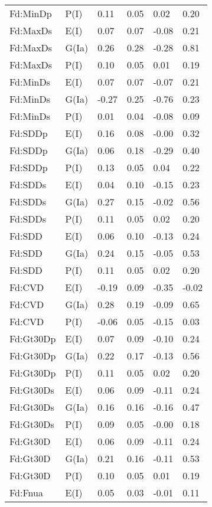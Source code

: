 \begin{center}
\begin{longtable}{|p{1.1in}|p{0.7in}|p{0.7in}|p{0.6in}|p{0.6in}|p{0.6in}|}
  Fd:MinDp & P(I) & 0.11 & 0.05 & 0.02 & 0.20 \\ 
  Fd:MaxDs & E(I) & 0.07 & 0.07 & -0.08 & 0.21 \\ 
  Fd:MaxDs & G(Ia) & 0.26 & 0.28 & -0.28 & 0.81 \\ 
  Fd:MaxDs & P(I) & 0.10 & 0.05 & 0.01 & 0.19 \\ 
  Fd:MinDs & E(I) & 0.07 & 0.07 & -0.07 & 0.21 \\ 
  Fd:MinDs & G(Ia) & -0.27 & 0.25 & -0.76 & 0.23 \\ 
  Fd:MinDs & P(I) & 0.01 & 0.04 & -0.08 & 0.09 \\ 
  Fd:SDDp & E(I) & 0.16 & 0.08 & -0.00 & 0.32 \\ 
  Fd:SDDp & G(Ia) & 0.06 & 0.18 & -0.29 & 0.40 \\ 
  Fd:SDDp & P(I) & 0.13 & 0.05 & 0.04 & 0.22 \\ 
  Fd:SDDs & E(I) & 0.04 & 0.10 & -0.15 & 0.23 \\ 
  Fd:SDDs & G(Ia) & 0.27 & 0.15 & -0.02 & 0.56 \\ 
  Fd:SDDs & P(I) & 0.11 & 0.05 & 0.02 & 0.20 \\ 
  Fd:SDD & E(I) & 0.06 & 0.10 & -0.13 & 0.24 \\ 
  Fd:SDD & G(Ia) & 0.24 & 0.15 & -0.05 & 0.53 \\ 
  Fd:SDD & P(I) & 0.11 & 0.05 & 0.02 & 0.20 \\ 
  Fd:CVD & E(I) & -0.19 & 0.09 & -0.35 & -0.02 \\ 
  Fd:CVD & G(Ia) & 0.28 & 0.19 & -0.09 & 0.65 \\ 
  Fd:CVD & P(I) & -0.06 & 0.05 & -0.15 & 0.03 \\ 
  Fd:Gt30Dp & E(I) & 0.07 & 0.09 & -0.10 & 0.24 \\ 
  Fd:Gt30Dp & G(Ia) & 0.22 & 0.17 & -0.13 & 0.56 \\ 
  Fd:Gt30Dp & P(I) & 0.11 & 0.05 & 0.02 & 0.20 \\ 
  Fd:Gt30Ds & E(I) & 0.06 & 0.09 & -0.11 & 0.24 \\ 
  Fd:Gt30Ds & G(Ia) & 0.16 & 0.16 & -0.16 & 0.47 \\ 
  Fd:Gt30Ds & P(I) & 0.09 & 0.05 & -0.00 & 0.18 \\ 
  Fd:Gt30D & E(I) & 0.06 & 0.09 & -0.11 & 0.24 \\ 
  Fd:Gt30D & G(Ia) & 0.21 & 0.16 & -0.11 & 0.53 \\ 
  Fd:Gt30D & P(I) & 0.10 & 0.05 & 0.01 & 0.19 \\ 
  Fd:Fnua & E(I) & 0.05 & 0.03 & -0.01 & 0.11 \\ 

\end{longtable}
\end{center}
